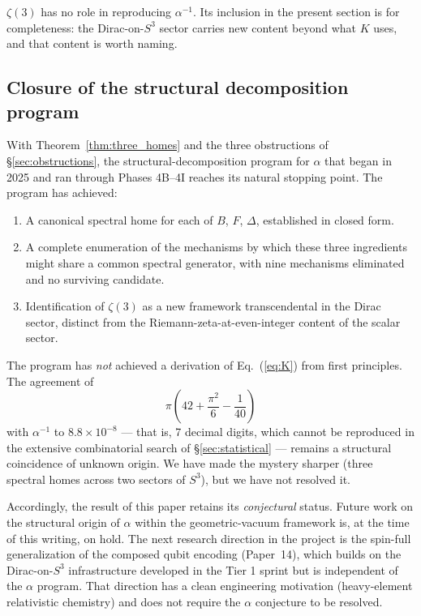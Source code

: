 $\zeta(3)$ has no role in reproducing $\alpha^{-1}$. Its inclusion in
the present section is for completeness: the Dirac-on-$S^{3}$ sector
carries new content beyond what $K$ uses, and that content is worth
naming.

\subsection{Closure of the structural decomposition program}\label{sec:closure}

With Theorem~\ref{thm:three_homes} and the three obstructions of
\S\ref{sec:obstructions}, the structural-decomposition program for
$\alpha$ that began in 2025 and ran through Phases 4B--4I reaches its
natural stopping point. The program has achieved:

\begin{enumerate}
  \item A canonical spectral home for each of $B$, $F$, $\Delta$,
    established in closed form.
  \item A complete enumeration of the mechanisms by which these three
    ingredients might share a common spectral generator, with nine
    mechanisms eliminated and no surviving candidate.
  \item Identification of $\zeta(3)$ as a new framework transcendental
    in the Dirac sector, distinct from the Riemann-zeta-at-even-integer
    content of the scalar sector.
\end{enumerate}

The program has \emph{not} achieved a derivation of Eq.~(\ref{eq:K})
from first principles. The agreement of
\begin{equation}
  \pi\!\left(42 + \frac{\pi^{2}}{6} - \frac{1}{40}\right)
\end{equation}
with $\alpha^{-1}$ to $8.8 \times 10^{-8}$ — that is, 7 decimal digits,
which cannot be reproduced in the extensive combinatorial search of
\S\ref{sec:statistical} — remains a structural coincidence of unknown
origin. We have made the mystery sharper (three spectral homes across
two sectors of $S^{3}$), but we have not resolved it.

Accordingly, the result of this paper retains its \emph{conjectural}
status. Future work on the structural origin of $\alpha$ within the
geometric-vacuum framework is, at the time of this writing, on hold.
The next research direction in the project is the spin-full
generalization of the composed qubit encoding (Paper~14), which builds
on the Dirac-on-$S^{3}$ infrastructure developed in the Tier 1 sprint
but is independent of the $\alpha$ program. That direction has a clean
engineering motivation (heavy-element relativistic chemistry) and does
not require the $\alpha$ conjecture to be resolved.

